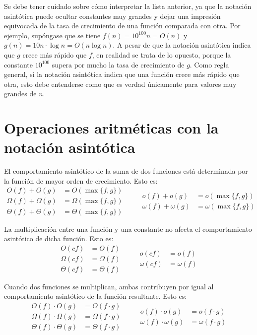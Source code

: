 Se debe tener cuidado sobre cómo interpretar la lista anterior, ya que la notación asintótica puede ocultar constantes muy grandes y dejar una impresión equivocada de la tasa de crecimiento de una función comparada con otra. 
Por ejemplo, supóngase que se tiene \(f(n)=10^{100}n=O(n)\) y \(g(n)=10n\cdot\log n=O(n\log n)\). 
A pesar de que la notación asintótica indica que \(g\) crece más rápido que \(f\), en realidad se trata de lo opuesto, porque la constante \(10^{100}\) supera por mucho la tasa de crecimiento de \(g\).
Como regla general, si la notación asintótica indica que una función crece más rápido que otra, esto debe entenderse como que es verdad únicamente para valores muy grandes de \(n\).

\section{Operaciones aritméticas con la notación asintótica}

El comportamiento asintótico de la suma de dos funciones está determinada por la función de mayor orden de crecimiento. 
Esto es:
\[
\begin{aligned}
    O(f)+O(g) &= O(\max\{f,g\})\\
    \Omega(f)+\Omega(g) &= \Omega(\max\{f,g\})\\
    \Theta(f)+\Theta(g) &= \Theta(\max\{f,g\})
\end{aligned}
\qquad
\begin{aligned}
    o(f)+o(g) &= o(\max\{f,g\})\\
    \omega(f)+\omega(g) &= \omega(\max\{f,g\})
\end{aligned}
\]

La multiplicación entre una función y una constante no afecta el
comportamiento asintótico de dicha función. 
Esto es:
\[
\begin{aligned}
    O(cf) &= O(f)\\
    \Omega(cf) &= \Omega(f)\\
    \Theta(cf) &= \Theta(f)
\end{aligned}
\qquad
\begin{aligned}
    o(cf) &= o(f)\\
    \omega(cf) &= \omega(f)
\end{aligned}
\]

Cuando dos funciones se multiplican, ambas contribuyen por igual al
comportamiento asintótico de la función resultante. 
Esto es:
\[
\begin{aligned}
    O(f)\cdot O(g) &= O(f\cdot g)\\
    \Omega(f)\cdot\Omega(g) &= \Omega(f\cdot g)\\
    \Theta(f)\cdot\Theta(g) &= \Theta(f\cdot g)
\end{aligned}
\qquad
\begin{aligned}
    o(f)\cdot o(g) &= o(f\cdot g)\\
    \omega(f)\cdot\omega(g) &= \omega(f\cdot g)
\end{aligned}
\]

